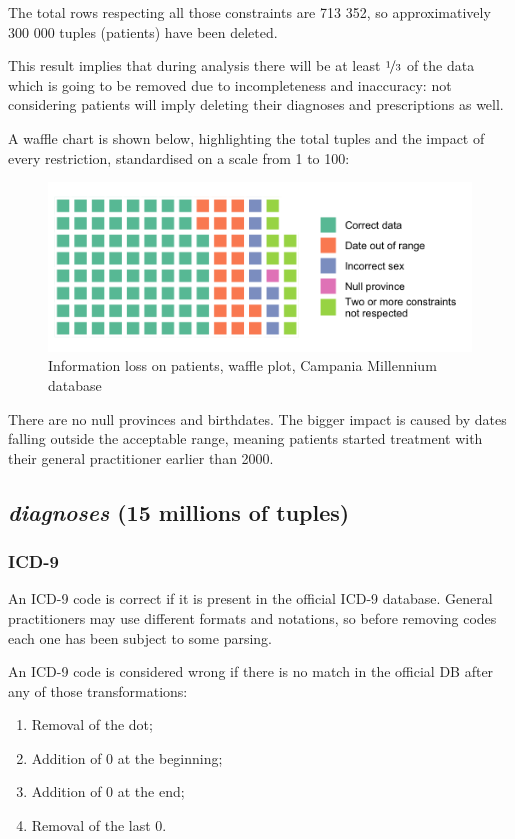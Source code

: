 The total rows respecting all those constraints are 713 352, so approximatively 300 000 tuples (patients) have been deleted. 

This result implies that during analysis there will be at least $\nicefrac{1}{3}$ of the data which is going to be removed due to incompleteness and inaccuracy: not considering patients will imply deleting their diagnoses and prescriptions as well.

A waffle chart is shown below, highlighting the total tuples and the impact of every restriction, standardised on a scale from 1 to 100:
\begin{figure}[h]
	\centering
	\includegraphics[scale=0.45]{../plots/patients-waffle.png}
	\caption{\small Information loss on patients, waffle plot, Campania Millennium database}
\end{figure}

There are no null provinces and birthdates. The bigger impact is caused by dates falling outside the acceptable range, meaning patients started treatment with their general practitioner earlier than 2000.

\subsection{\textit{diagnoses} (15 millions of tuples)}
\subsubsection{ICD-9}
An ICD-9 code is correct if it is present in the official ICD-9 database\cite{icd9}. General practitioners may use different formats and notations, so before removing codes each one has been subject to some parsing.

An ICD-9 code is considered wrong if there is no match in the official DB after any of those transformations:
\begin{enumerate}
	\item Removal of the dot;
	\item Addition of 0 at the beginning;
	\item Addition of 0 at the end;
	\item Removal of the last 0.
\end{enumerate}

